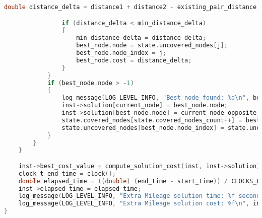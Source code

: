 \begin{lstlisting}[language=C]
                double distance_delta = distance1 + distance2 - existing_pair_distance;

                if (distance_delta < min_distance_delta)
                {
                    min_distance_delta = distance_delta;
                    best_node.node = state.uncovered_nodes[j];
                    best_node.node_index = j;
                    best_node.cost = distance_delta;
                }
            }
            if (best_node.node > -1)
            {
                log_message(LOG_LEVEL_INFO, "Best node found: %d\n", best_node.node);
                inst->solution[current_node] = best_node.node;
                inst->solution[best_node.node] = current_node_opposite;
                state.covered_nodes[state.covered_nodes_count++] = best_node.node;
                state.uncovered_nodes[best_node.node_index] = state.uncovered_nodes[--state.uncovered_nodes_count];
            }
        }
    }

    inst->best_cost_value = compute_solution_cost(inst, inst->solution);
    clock_t end_time = clock();
    double elapsed_time = ((double) (end_time - start_time)) / CLOCKS_PER_SEC;
    inst->elapsed_time = elapsed_time;
    log_message(LOG_LEVEL_INFO, "Extra Mileage solution time: %f seconds\n", elapsed_time);
    log_message(LOG_LEVEL_INFO, "Extra Mileage solution cost: %f\n", inst->best_cost_value);
}
\end{lstlisting}